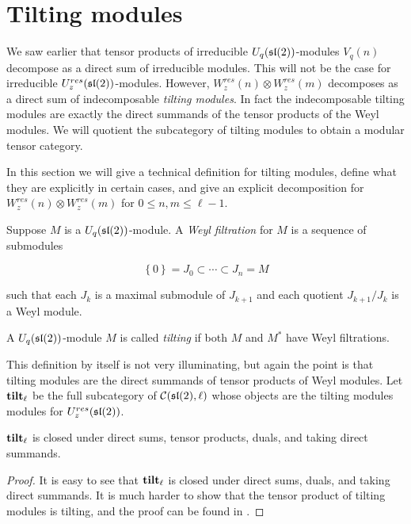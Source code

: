 \section{Tilting modules} 
\label{section:Tilting}

We saw earlier that tensor products of irreducible $U_q(\mathfrak{sl}(2))$-modules
$V_q(n)$ decompose as a direct sum of irreducible modules. This will not be the
case for irreducible $U_z^{res}(\mathfrak{sl}(2))$-modules. However,
$W_z^{res}(n)\otimes W_z^{res}(m)$ decomposes as a direct sum of indecomposable
\emph{tilting modules}. In fact the indecomposable tilting modules are exactly
the direct summands of the tensor products of the Weyl modules. We will
quotient the subcategory of tilting modules to obtain a modular tensor
category. 

In this section we will give a technical definition for tilting modules, define
what they are explicitly in certain cases, and give an explicit decomposition
for $W^{res}_z(n) \otimes W_z^{res}(m)$ for $0 \leq n,m \leq \ell - 1$.

\begin{defn}
    Suppose $M$ is a $U_q(\mathfrak{sl}(2))$-module. A \emph{Weyl filtration} for $M$
    is a sequence of submodules 

    \begin{equation}
        \left\{ 0 \right\} = J_0 \subset \cdots \subset J_n = M
    \end{equation}

    such that each $J_k$ is a maximal submodule of $J_{k+1}$ and each quotient $J_{k+1}/J_k$ is a Weyl module. 
\end{defn}

\begin{defn}
    A $U_q(\mathfrak{sl}(2))$-module $M$ is called \emph{tilting} if both $M$ and $M^*$ have Weyl filtrations.
\end{defn}

This definition by itself is not very illuminating, but again the point is that
tilting modules are the direct summands of tensor products of Weyl modules.
Let $\mathbf{tilt}_\ell$ be the full subcategory of $\mathcal{C}(\mathfrak{sl}(2), \ell)$ whose
objects are the tilting modules modules for $U_z^{res}(\mathfrak{sl}(2))$.  

\begin{prop}
    $\mathbf{tilt}_\ell$ is closed under direct sums, tensor products, duals, and taking direct summands.
\end{prop}
\begin{proof}
    It is easy to see that $\mathbf{tilt}_\ell$ is closed under direct sums, duals, and
    taking direct summands. It is much harder to show that the tensor product
    of tilting modules is tilting, and the proof can be found in \cite{Andersen1992}.
\end{proof}

